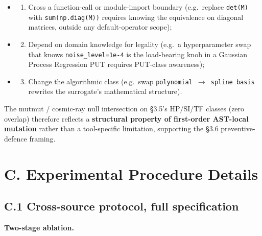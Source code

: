 \documentclass[manuscript,screen,review]{acmart}
\begin{document}
\begin{itemize}

\item
  \begin{enumerate}[label=(\alph*)]
  
  \item
    Cross a function-call or module-import boundary (e.g.~replace
    \texttt{det(M)} with \texttt{sum(np.diag(M))} requires knowing the
    equivalence on diagonal matrices, outside any default-operator
    scope);
  \end{enumerate}
\item
  \begin{enumerate}[label=(\alph*)]
  \setcounter{enumi}{1}
  
  \item
    Depend on domain knowledge for legality (e.g.~a hyperparameter swap
    that knows \texttt{noise\_level=1e-4} is the load-bearing knob in a
    Gaussian Process Regression PUT requires PUT-class awareness);
  \end{enumerate}
\item
  \begin{enumerate}[label=(\alph*)]
  \setcounter{enumi}{2}
  
  \item
    Change the algorithmic class (e.g.~swap
    \texttt{polynomial\ $\to$\ spline\ basis} rewrites the surrogate's
    mathematical structure).
  \end{enumerate}
\end{itemize}

The mutmut / cosmic-ray null intersection on §3.5's HP/SI/TF classes
(zero overlap) therefore reflects a \textbf{structural property of
first-order AST-local mutation} rather than a tool-specific limitation,
supporting the §3.6 preventive-defence framing.


\section{C. Experimental Procedure Details}\label{c.-experimental-procedure-details}

\subsection{C.1 Cross-source protocol, full specification}\label{c.1-cross-source-v4-protocol-full-specification}

\textbf{Two-stage ablation.}
\end{document}
